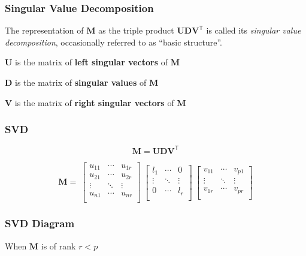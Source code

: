 \documentclass[12pt]{beamer}\usepackage[]{graphicx}\usepackage[]{color}
\begin{document}
\begin{frame}
\frametitle{Singular Value Decomposition}

The representation of $\mathbf{M}$ as the triple product $\mathbf{U D V^\mathsf{T}}$
is called its {\mdlit \textit{singular value decomposition}}, occasionally
referred to as ``basic structure''.

\bigskip

\bbi
 \item $\mathbf{U}$ is the matrix of \textbf{left singular vectors} of $\mathbf{M}$
 \item $\mathbf{D}$ is the matrix of \textbf{singular values} of $\mathbf{M}$
 \item $\mathbf{V}$ is the matrix of \textbf{right singular vectors} of $\mathbf{M}$
\ei

\end{frame}


\begin{frame}
\frametitle{SVD}

$$
\mathbf{M = U D V^\mathsf{T}}
$$

$$
\mathbf{M} = 
\
\begin{bmatrix} 
u_{11} & \cdots & u_{1r} \\
u_{21} & \cdots & u_{2r} \\
\vdots & \ddots & \vdots \\
u_{n1} & \cdots & u_{nr} \\
\end{bmatrix}
\
\begin{bmatrix} 
l_1 & \cdots & 0 \\ 
\vdots & \ddots & \vdots \\
0 & \cdots & l_r \\
\end{bmatrix}
\
\begin{bmatrix} 
v_{11} & \cdots & v_{p1} \\
\vdots & \ddots & \vdots \\
v_{1r} & \cdots & v_{pr} \\
\end{bmatrix}
$$

\end{frame}


\begin{frame}
\frametitle{SVD Diagram}
\begin{center}

{\lolit When $\mathbf{M}$ is of rank $r < p$}
\end{center}
\end{frame}
\end{document}
